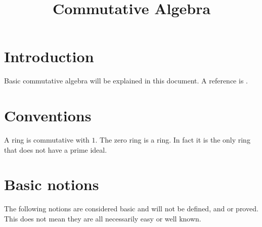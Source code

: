 

%


\title{Commutative Algebra}


\maketitle

\tableofcontents

\section{Introduction}
\label{section-introduction}

\noindent
Basic commutative algebra will be explained in this document.
A reference is \cite{MatCA}.

\section{Conventions}
\label{section-conventions}

\noindent
A ring is commutative with $1$. The zero ring is a ring. In fact it is
the only ring that does not have a prime ideal.

\section{Basic notions}
\label{section-rings-basic}

\noindent
The following notions are considered basic and will not be defined,
and or proved. This does not mean they are all necessarily easy or 
well known.

